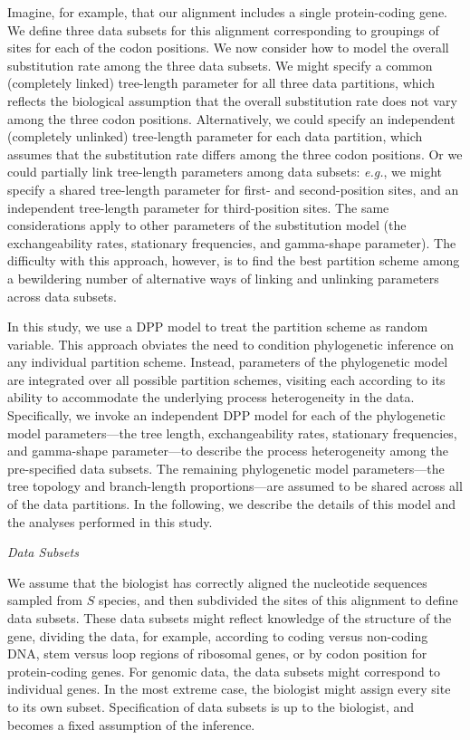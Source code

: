 \documentclass[11pt]{article}
\begin{document}
Imagine, for example, that our alignment includes a single protein-coding gene.
We define three data subsets for this alignment corresponding to groupings of sites for each of the codon positions.
We now consider how to model the overall substitution rate among the three data subsets.
We might specify a common (completely linked) tree-length parameter for all three data partitions, which reflects the biological assumption that the overall substitution rate does not vary among the three codon positions.
Alternatively, we could specify an independent (completely unlinked) tree-length parameter for each data partition, which assumes that the substitution rate differs among the three codon positions.
Or we could partially link tree-length parameters among data subsets: {\it e.g.}, we might specify a shared tree-length parameter for first- and second-position sites, and an independent tree-length parameter for third-position sites.
The same considerations apply to other parameters of the substitution model (the exchangeability rates, stationary frequencies, and gamma-shape parameter).
The difficulty with this approach, however, is to find the best partition scheme among a bewildering number of alternative ways of linking and unlinking parameters across data subsets.

In this study, we use a DPP model to treat the partition scheme as random variable.
This approach obviates the need to condition phylogenetic inference on any individual partition scheme.
Instead, parameters of the phylogenetic model are integrated over all possible partition schemes, visiting each according to its ability to accommodate the underlying process heterogeneity in the data.
Specifically, we invoke an independent DPP model for each of the phylogenetic model parameters---the tree length, exchangeability rates, stationary frequencies, and gamma-shape parameter---to describe the process heterogeneity among the pre-specified data subsets. 
The remaining phylogenetic model parameters---the tree topology and branch-length proportions---are assumed to be shared across all of the data partitions.
In the following, we describe the details of this model and the analyses performed in this study.

\begin{center}
{\it Data Subsets}
\end{center}

We assume that the biologist has correctly aligned the nucleotide sequences sampled from $S$ species, and then subdivided the sites of this alignment to define data subsets. 
These data subsets might reflect knowledge of the structure of the gene, dividing the data, for example, according to coding versus non-coding DNA, stem versus loop regions of ribosomal genes, or by codon position for protein-coding genes.
For genomic data, the data subsets might correspond to individual genes. 
In the most extreme case, the biologist might assign every site to its own subset.
Specification of data subsets is up to the biologist, and becomes a fixed assumption of the inference.
\end{document}
